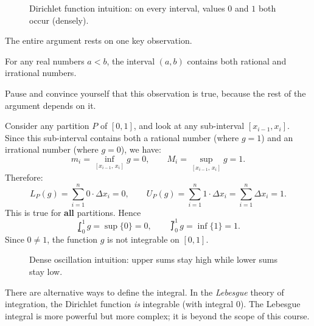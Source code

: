 \begin{figure}[ht]
  \centering
  
  \caption{Dirichlet function intuition: on every interval, values $0$ and $1$ both occur (densely).}
  \label{fig:dirichlet-function}
\end{figure}

The entire argument rests on one key observation.

\begin{remark}
For any real numbers $a < b$, the interval $(a,b)$ contains both rational and irrational numbers.
\end{remark}

\begin{remark}
Pause and convince yourself that this observation is true, because the rest of the argument depends on it.
\end{remark}

Consider any partition $P$ of $[0,1]$, and look at any sub-interval $[x_{i-1},x_i]$.  Since this sub-interval contains both a rational number (where $g = 1$) and an irrational number (where $g = 0$), we have:
\[
  m_i = \inf_{[x_{i-1},\,x_i]} g = 0, \qquad M_i = \sup_{[x_{i-1},\,x_i]} g = 1.
\]
Therefore:
\[
  L_P(g) = \sum_{i=1}^{n} 0 \cdot \Delta x_i = 0, \qquad
  U_P(g) = \sum_{i=1}^{n} 1 \cdot \Delta x_i = \sum_{i=1}^{n} \Delta x_i = 1.
\]
This is true for \textbf{all} partitions.  Hence
\[
  \lowint_{0}^{1} g = \sup\{0\} = 0, \qquad
  \upint_{0}^{1} g = \inf\{1\} = 1.
\]
Since $0 \ne 1$, the function $g$ is not integrable on $[0,1]$.

\begin{figure}[ht]
  \centering
  \resizebox{0.85\textwidth}{!}{}
  \caption{Dense oscillation intuition: upper sums stay high while lower sums stay low.}
  \label{fig:nonintegrable-dense-oscillation}
\end{figure}

\begin{remark}
There are alternative ways to define the integral.  In the \emph{Lebesgue} theory of integration, the Dirichlet function \textit{is} integrable (with integral $0$).  The Lebesgue integral is more powerful but more complex; it is beyond the scope of this course.
\end{remark}

